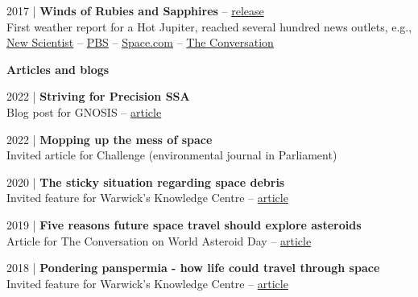 \documentclass[10pt,a4paper]{altacv}
\begin{document}
\smallskip

\small 2017 | \textbf{Winds of Rubies and Sapphires} -- \href{https://warwick.ac.uk/newsandevents/pressreleases/winds_of_rubies/}{release} \\
First weather report for a Hot Jupiter, reached several hundred news outlets, e.g., \href{https://www.newscientist.com/article/2115792-first-exoplanet-weather-report-shows-clouds-of-ruby-and-sapphire/}{New Scientist} -- \href{https://www.pbs.org/newshour/science/heres-first-weather-report-exoplanet}{PBS} -- \href{https://www.space.com/34992-giant-alien-planet-ruby-clouds-weather.html}{Space.com} --
\href{https://theconversation.com/how-we-caught-the-first-glimpse-of-weather-on-a-faraway-gas-giant-70229}{The Conversation}

\divider


\normalsize \textbf{Articles and blogs}

\medskip

\small 2022 | \textbf{Striving for Precision SSA} \\
Blog post for GNOSIS -- \href{https://gnosisnetwork.org/blog/striving-for-precision-ssa/}{article}

\smallskip

\small 2022 | \textbf{Mopping up the mess of space} \\
Invited article for Challenge (environmental journal in Parliament)

\smallskip

\small 2020 | \textbf{The sticky situation regarding space debris} \\
Invited feature for Warwick's Knowledge Centre -- \href{https://warwick.ac.uk/newsandevents/knowledgecentre/science/physics-astrophysics/space_debris}{article}

\smallskip

\small 2019 | \textbf{Five reasons future space travel should explore asteroids} \\
Article for The Conversation on World Asteroid Day -- \href{https://theconversation.com/five-reasons-future-space-travel-should-explore-asteroids-119246}{article}

\smallskip

\small 2018 | \textbf{Pondering panspermia - how life could travel through space} \\
Invited feature for Warwick's Knowledge Centre -- \href{https://warwick.ac.uk/newsandevents/knowledgecentre/science/physics-astrophysics/panspermia}{article}
\end{document}

